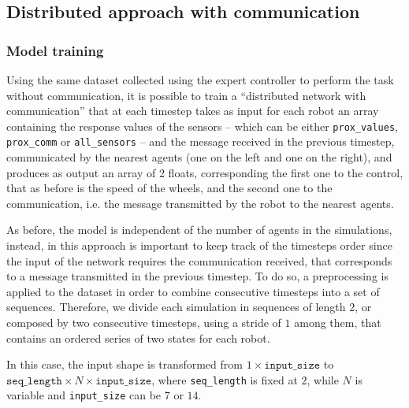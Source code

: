 \subsection{Distributed approach with communication}
\label{subsec:ex1comm}


\subsubsection{Model training}
\label{subsubsec:learnedcomm}

Using the same dataset collected using the expert controller to perform the task 
without communication, it is possible to train a ``distributed network with 
communication'' that at each timestep takes as input for each robot an array 
containing the response values of the sensors – which can be either 
\texttt{prox\_values}, \texttt{prox\_comm} or \texttt{all\_sensors} – and the 
message received in the previous timestep, communicated by the nearest agents 
(one on the left and one on the right), and produces as output an array of 2 
floats, corresponding the first one to the control, that as before is the speed of the 
wheels, and the second one to the communication, i.e. the message transmitted 
by the robot to the nearest agents.

As before, the model is independent of the number of agents in the simulations, 
instead, in this approach is important to keep track of the timesteps order since 
the input of the network requires the communication received, that corresponds 
to a message transmitted in the previous timestep. 
To do so, a preprocessing is applied to the dataset in order to combine 
consecutive timesteps into a set of sequences. Therefore, we divide each 
simulation in sequences of length $2$, or composed by two consecutive 
timesteps, using a stride of $1$ among them, that contains an ordered series of 
two states for each robot.   

In this case, the input shape is transformed from $1 \times \mathtt{input\_size}$ 
to $\mathtt{seq\_length} \times N \times \mathtt{input\_size}$, where 
\texttt{seq\_length} is fixed at $2$, while $N$ is variable and \texttt{input\_size} 
can be $7$ or $14$.

